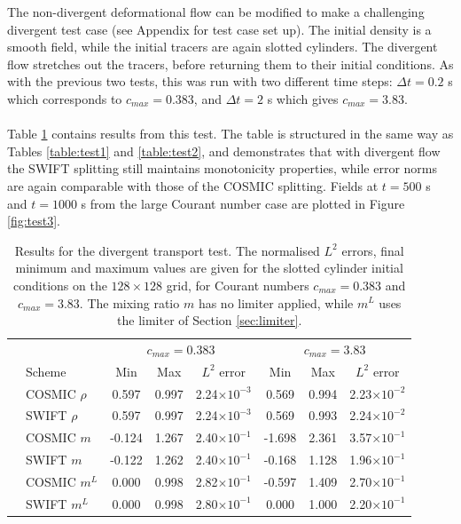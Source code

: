 \documentclass[11pt,a4paper]{article}
\begin{document}
The non-divergent deformational flow can be modified to make a challenging divergent test case (see Appendix for test case set up). The initial density is a smooth field, while the initial tracers are again slotted cylinders. The divergent flow stretches out the tracers, before returning them to their initial conditions.
As with the previous two tests, this was run with two different time steps: $\Delta t=0.2$ s which corresponds to $c_{max}=0.383$, and $\Delta t=2$ s which gives $c_{max}=3.83$. \\
\\
Table \ref{table:test3} contains results from this test.
The table is structured in the same way as Tables \ref{table:test1} and \ref{table:test2}, and demonstrates that with divergent flow the SWIFT splitting still maintains monotonicity properties, while error norms are again comparable with those of the COSMIC splitting.
Fields at $t=500$ s and $t=1000$ s from the large Courant number case are plotted in Figure \ref{fig:test3}. \\
\begin{table}[h!]
\small
\begin{center}
\begin{tabular}{| c | l | c c c | c c c |} \hline
  &  & \multicolumn{3}{c|}{$c_{max}=0.383$} & \multicolumn{3}{c|}{$c_{max}=3.83$} \\
  & Scheme &  Min & Max & $L^2$ error & Min & Max & $L^2$ error   \\ \hline
  \parbox[t]{2mm}{}
  & COSMIC $\rho$ & 0.597 & 0.997 & 2.24$\times 10^{-3}$ & 0.569 & 0.994 & 2.23$\times 10^{-2}$ \\
  & SWIFT $\rho$ & 0.597 & 0.997 & 2.24$\times 10^{-3}$ & 0.569 & 0.993 & 2.24$\times 10^{-2}$ \\
  & COSMIC $m$ & -0.124 & 1.267 & 2.40$\times 10^{-1}$ & -1.698 & 2.361 & 3.57$\times 10^{-1}$ \\
  & SWIFT $m$ & -0.122 & 1.262 & 2.40$\times 10^{-1}$ & -0.168 & 1.128 & 1.96$\times 10^{-1}$ \\
  & COSMIC $m^L$ & 0.000 & 0.998 & 2.82$\times 10^{-1}$ & -0.597 & 1.409 & 2.70$\times 10^{-1}$ \\
  & SWIFT $m^L$ & 0.000 & 0.998 & 2.80$\times 10^{-1}$ & 0.000 & 1.000 & 2.20$\times 10^{-1}$ \\ \hline
\end{tabular}
\caption{Results for the divergent transport test. The normalised $L^2$ errors, final minimum and maximum values are given for the slotted cylinder initial conditions on the $128\times128$ grid, for Courant numbers $c_{max}=0.383$ and $c_{max}=3.83$.
The mixing ratio $m$ has no limiter applied, while $m^L$ uses the limiter of Section \ref{sec:limiter}.}
\label{table:test3}
\end{center}
\end{table}
\end{document}
